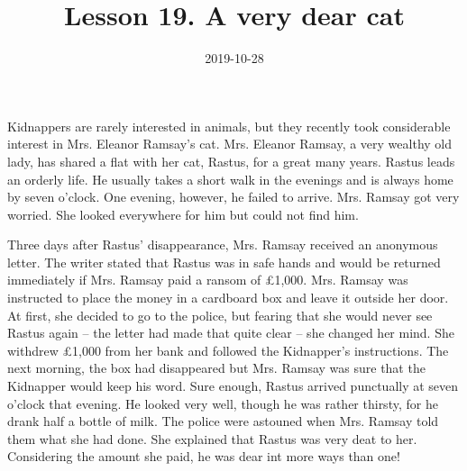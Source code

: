 \documentclass[a4paper,12pt]{article}
\title{Lesson 19. A very dear cat}
\author{}
\date{2019-10-28}
\begin{document}
\maketitle
Kidnappers are rarely interested in animals, but they recently took considerable interest in Mrs. Eleanor Ramsay's cat. Mrs. Eleanor Ramsay, a very wealthy old lady, has shared a flat with her cat, Rastus, for a great many years. Rastus leads an orderly life. He usually takes a short walk in the evenings and is always home by seven o'clock. One evening, however, he failed to arrive. Mrs. Ramsay got very worried. She looked everywhere for him but could not find him.

Three days after Rastus' disappearance, Mrs. Ramsay received an anonymous letter. The writer stated that Rastus was in safe hands and would be returned immediately if Mrs. Ramsay paid a ransom of \pounds 1,000. Mrs. Ramsay was instructed to place the money in a cardboard box and leave it outside her door. At first, she decided to go to the police, but fearing that she would never see Rastus again -- the letter had made that quite clear -- she changed her mind. She withdrew \pounds 1,000 from her bank and followed the Kidnapper's instructions. The next morning, the box had disappeared but Mrs. Ramsay was sure that the Kidnapper would keep his word. Sure enough, Rastus arrived punctually at seven o'clock that evening. He looked very well, though he was rather thirsty, for he drank half a bottle of milk. The police were astouned when Mrs. Ramsay told them what she had done. She explained that Rastus was very deat to her. Considering the amount she paid, he was dear int more ways than one!
\end{document}
